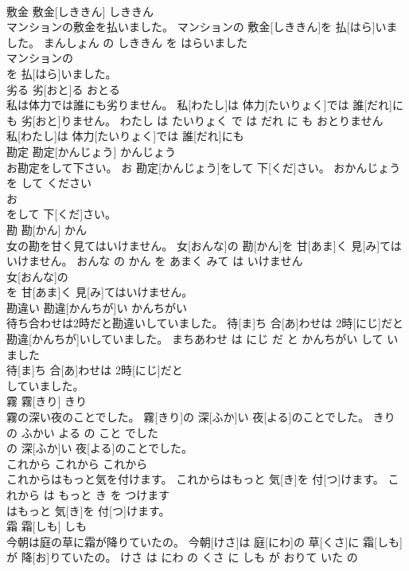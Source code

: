 \documentclass[8pt]{extreport}
\begin{document}
\begin{CJK}{UTF8}{min}
\\	敷金	敷金[しききん]	しききん	
\\	マンションの敷金を払いました。	マンションの 敷金[しききん]を 払[はら]いました。	まんしょん の しききん を はらいました	
\\	マンションの
\\	を 払[はら]いました。			
\\	劣る	劣[おと]る	おとる	
\\	私は体力では誰にも劣りません。	私[わたし]は 体力[たいりょく]では 誰[だれ]にも 劣[おと]りません。	わたし は たいりょく で は だれ に も おとりません	
\\	私[わたし]は 体力[たいりょく]では 誰[だれ]にも
\\	勘定	勘定[かんじょう]	かんじょう	
\\	お勘定をして下さい。	お 勘定[かんじょう]をして 下[くだ]さい。	おかんじょう を して ください	
\\	お
\\	をして 下[くだ]さい。			
\\	勘	勘[かん]	かん	
\\	女の勘を甘く見てはいけません。	女[おんな]の 勘[かん]を 甘[あま]く 見[み]てはいけません。	おんな の かん を あまく みて は いけません	
\\	女[おんな]の
\\	を 甘[あま]く 見[み]てはいけません。			
\\	勘違い	勘違[かんちが]い	かんちがい	
\\	待ち合わせは2時だと勘違いしていました。	待[ま]ち 合[あ]わせは 2時[にじ]だと 勘違[かんちが]いしていました。	まちあわせ は にじ だ と かんちがい して いました	
\\	待[ま]ち 合[あ]わせは 2時[にじ]だと
\\	していました。			
\\	霧	霧[きり]	きり	
\\	霧の深い夜のことでした。	霧[きり]の 深[ふか]い 夜[よる]のことでした。	きり の ふかい よる の こと でした	
\\	の 深[ふか]い 夜[よる]のことでした。			
\\	これから	これから	これから	
\\	これからはもっと気を付けます。	これからはもっと 気[き]を 付[つ]けます。	これから は もっと き を つけます	
\\	はもっと 気[き]を 付[つ]けます。			
\\	霜	霜[しも]	しも	
\\	今朝は庭の草に霜が降りていたの。	今朝[けさ]は 庭[にわ]の 草[くさ]に 霜[しも]が 降[お]りていたの。	けさ は にわ の くさ に しも が おりて いた の	

\end{CJK}
\end{document}
